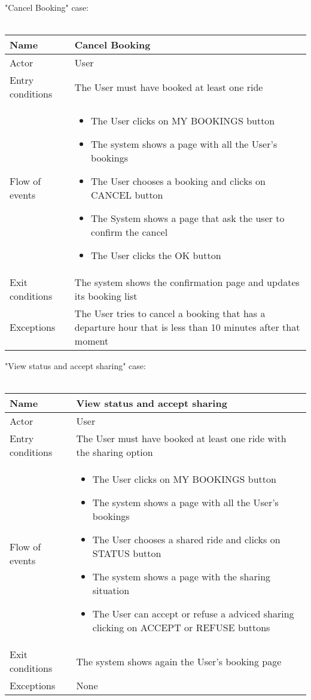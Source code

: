 \newpage
"Cancel Booking" case:
\\
\\
\begin{tabular}{|l|p{10cm}|} 
\hline
Name & Cancel Booking\\
\hline
Actor & User\\
\hline
Entry conditions & The User must have booked at least one ride\\
\hline
Flow of events &
	\begin{itemize}
		\item The User clicks on MY BOOKINGS button
		\item The system shows a page with all the User's bookings
		\item The User chooses a booking and clicks on CANCEL button
		\item The System shows a page that ask the user to confirm the cancel \askpippo
		\item The User clicks the OK button
	\end{itemize}\\
\hline
Exit conditions & The system shows the confirmation page and updates its booking list\\
\hline
Exceptions & The User tries to cancel a booking that has a departure hour that is less than 10 minutes after that moment\\
\hline
\end {tabular}

\newpage
"View status and accept sharing" case:
\\
\\
\begin{tabular}{|l|p{10cm}|} 
\hline
Name & View status and accept sharing\\
\hline
Actor & User\\
\hline
Entry conditions & The User must have booked at least one ride with the sharing option\\
\hline
Flow of events & 
	\begin{itemize}
			\item The User clicks on MY BOOKINGS button
			\item The system shows a page with all the User's bookings
			\item The User chooses a shared ride and clicks on STATUS button
			\item The system shows a page with the sharing situation
			\item The User can accept or refuse a adviced sharing clicking on ACCEPT or REFUSE buttons
	\end{itemize}\\
\hline
Exit conditions & The system shows again the User's booking page\\
\hline
Exceptions & None\\
\hline
\end {tabular}


